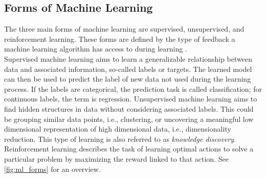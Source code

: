 \subsection{Forms of Machine Learning}
\label{theory:ml:forms}
The three main forms of machine learning are supervised, unsupervised, and reinforcement learning. These forms are defined by the type of feedback a machine learning algorithm has access to during learning \cite{Shalev2014}.\\
Supervised machine learning aims to learn a generalizable relationship between data and associated information, so-called labels or targets. The learned model can then be used to predict the label of new data not used during the learning process. If the labels are categorical, the prediction task is called classification; for continuous labels, the term is regression. Unsupervised machine learning aims to find hidden structures in data without considering associated labels. This could be grouping similar data points, i.e., clustering, or uncovering a meaningful low dimensional representation of high dimensional data, i.e., dimensionality reduction. This type of learning is also referred to as \textit{knowledge discovery}\cite{Murphy2012}. Reinforcement learning describes the task of learning optimal actions to solve a particular problem by maximizing the reward linked to that action. See \autoref{fig:ml_forms} for an overview.\\
\\

